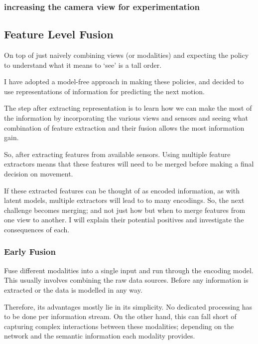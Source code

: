 \subsubsection{increasing the camera view for experimentation}

\subsection{Feature Level Fusion}
On top of just naively combining views (or modalities) and expecting the policy to understand what it means to `see' is a tall order. 

I have adopted a model-free approach in making these policies, and decided to use representations of information for predicting the next motion.

The step after extracting representation is to learn how we can make the most of the information by incorporating the various views and sensors and seeing what combination of feature extraction and their fusion allows the most information gain.

So, after extracting features from available sensors. Using multiple feature extractors means that these features will need to be merged before making a final decision on movement.

If these extracted features can be thought of as encoded information, as with latent models, multiple extractors will lead to to many encodings. So, the next challenge becomes merging; and not just how but when to merge features from one view to another. I will explain their potential positives and investigate the consequences of each.

\subsubsection{Early Fusion}
Fuse different modalities into a single input and run through the encoding model. This usually involves combining the raw data sources. Before any information is extracted or the data is modelled in any way.

Therefore, its advantages mostly lie in its simplicity. No dedicated processing has to be done per information stream. On the other hand, this can fall short of capturing complex interactions between these modalities; depending on the network and the semantic information each modality provides.

